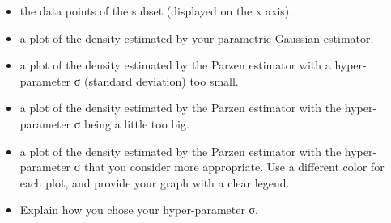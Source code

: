 \documentclass[11pt]{article}
\providecommand{\tightlist}{%
      \setlength{\itemsep}{0pt}\setlength{\parskip}{0pt}}
\begin{document}
\begin{itemize}
\tightlist
\item
  the data points of the subset (displayed on the x axis).
\item
  a plot of the density estimated by your parametric Gaussian estimator.
\item
  a plot of the density estimated by the Parzen estimator with a
  hyper-parameter σ (standard deviation) too small.
\item
  a plot of the density estimated by the Parzen estimator with the
  hyper-parameter σ being a little too big.
\item
  a plot of the density estimated by the Parzen estimator with the
  hyper-parameter σ that you consider more appropriate. Use a different
  color for each plot, and provide your graph with a clear legend.
\item
  Explain how you chose your hyper-parameter σ.
\end{itemize}
\end{document}
